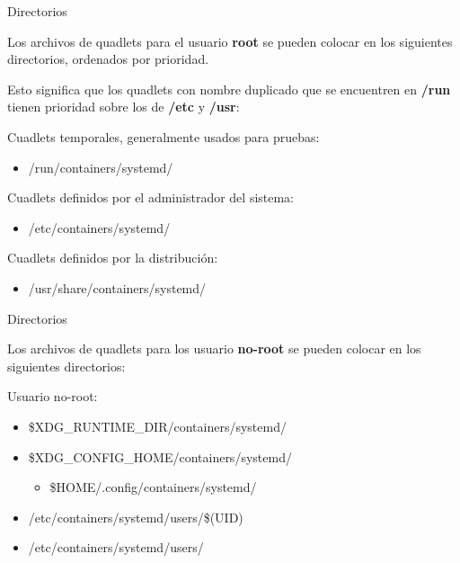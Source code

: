 \begin{frame}[c]{Directorios}

  Los archivos de quadlets para el usuario \textbf{root} se pueden
  colocar en los siguientes directorios, ordenados por prioridad.

  Esto significa que los quadlets con nombre duplicado que se
  encuentren en \textbf{/run} tienen prioridad sobre los de
  \textbf{/etc} y \textbf{/usr}:
  \pausa
  \begin{alertblock}{Cuadlets temporales, generalmente usados para pruebas:}
    \begin{itemize}
      \item /run/containers/systemd/
    \end{itemize}
  \end{alertblock}
  \pausa
  \begin{exampleblock}{Cuadlets definidos por el administrador del sistema:}
    \begin{itemize}
      \item /etc/containers/systemd/
    \end{itemize}
  \end{exampleblock}
  \pausa
  \begin{block}{Cuadlets definidos por la distribución:}
    \begin{itemize}
      \item /usr/share/containers/systemd/
    \end{itemize}
  \end{block}
\end{frame}

\begin{frame}[c]{Directorios}

  Los archivos de quadlets para los usuario \textbf{no-root} se pueden
  colocar en los siguientes directorios:

  \vspace{\baselineskip}
  \begin{exampleblock}{Usuario no-root:}
    \begin{itemize}
      \item \$XDG\_RUNTIME\_DIR/containers/systemd/
      \pausa
      \item \$XDG\_CONFIG\_HOME/containers/systemd/
      \pausa
        \begin{itemize}
          \item \$HOME/.config/containers/systemd/
        \end{itemize}
      \pausa
      \item /etc/containers/systemd/users/\$(UID)
      \pausa
      \item /etc/containers/systemd/users/
    \end{itemize}
  \end{exampleblock}
\end{frame}

